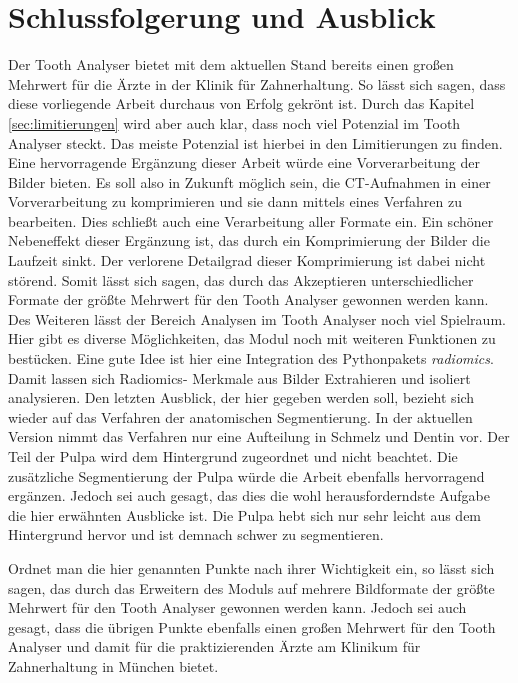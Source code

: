 \chapter{Schlussfolgerung und Ausblick}
\label{chap:schlussfolgerung} Der Tooth Analyser bietet mit dem aktuellen Stand bereits
einen großen Mehrwert für die Ärzte in der Klinik für Zahnerhaltung. So lässt
sich sagen, dass diese vorliegende Arbeit durchaus von Erfolg gekrönt ist. Durch
das Kapitel \ref{sec:limitierungen} wird aber auch klar, dass noch viel Potenzial
im Tooth Analyser steckt. Das meiste Potenzial ist hierbei in den Limitierungen
zu finden. Eine hervorragende Ergänzung dieser Arbeit würde eine Vorverarbeitung
der Bilder bieten. Es soll also in Zukunft möglich sein, die \ac{CT}-Aufnahmen
in einer Vorverarbeitung zu komprimieren und sie dann mittels eines Verfahren zu
bearbeiten. Dies schließt auch eine Verarbeitung aller Formate ein. Ein schöner
Nebeneffekt dieser Ergänzung ist, das durch ein Komprimierung der Bilder die Laufzeit
sinkt. Der verlorene Detailgrad dieser Komprimierung ist dabei nicht störend. Somit
lässt sich sagen, das durch das Akzeptieren unterschiedlicher Formate der größte
Mehrwert für den Tooth Analyser gewonnen werden kann. Des Weiteren lässt der Bereich
Analysen im Tooth Analyser noch viel Spielraum. Hier gibt es diverse
Möglichkeiten, das Modul noch mit weiteren Funktionen zu bestücken. Eine gute
Idee ist hier eine Integration des Pythonpakets \textit{radiomics}. Damit lassen
sich Radiomics- Merkmale aus Bilder Extrahieren und isoliert analysieren. Den
letzten Ausblick, der hier gegeben werden soll, bezieht sich wieder auf das
Verfahren der anatomischen Segmentierung. In der aktuellen Version nimmt das Verfahren
nur eine Aufteilung in Schmelz und Dentin vor. Der Teil der Pulpa wird dem
Hintergrund zugeordnet und nicht beachtet. Die zusätzliche Segmentierung der Pulpa
würde die Arbeit ebenfalls hervorragend ergänzen. Jedoch sei auch gesagt, das dies
die wohl herausforderndste Aufgabe die hier erwähnten Ausblicke ist. Die Pulpa
hebt sich nur sehr leicht aus dem Hintergrund hervor und ist demnach schwer zu
segmentieren.

Ordnet man die hier genannten Punkte nach ihrer Wichtigkeit ein, so lässt sich sagen,
das durch das Erweitern des Moduls auf mehrere Bildformate der größte Mehrwert
für den Tooth Analyser gewonnen werden kann. Jedoch sei auch gesagt, dass die
übrigen Punkte ebenfalls einen großen Mehrwert für den Tooth Analyser und damit
für die praktizierenden Ärzte am Klinikum für Zahnerhaltung in München bietet.
